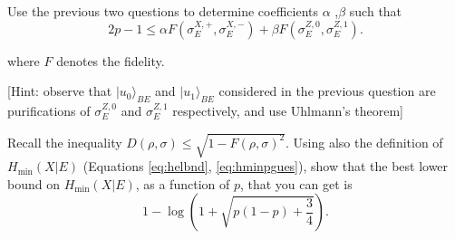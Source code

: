 \documentclass[a4paper,10pt,landscape,twocolumn]{scrartcl}
\begin{document}
\begin{exercise}
\begin{subex}[Problem 4]
Use the previous two questions to determine coefficients $\alpha$ ,$\beta$ such that
\begin{equation}
2p-1 \leq \alpha F(\sigma _ E^{X,+},\sigma _ E^{X,-}) + \beta F(\sigma _ E^{Z,0},\sigma _ E^{Z,1}).
\end{equation}


where $F$ denotes the fidelity.

[Hint: observe that $|u_0\rangle _{BE}$ and $|u_1\rangle _{BE}$ considered in the previous question are purifications of $\sigma _ E^{Z,0}$ and $\sigma _ E^{Z,1}$ respectively, and use Uhlmann's theorem] 
\end{subex}

\begin{subex}[Problem 5]
Recall the inequality $D(\rho ,\sigma ) \leq \sqrt {1-F(\rho ,\sigma )^2}$. Using also the definition of $H_{\min} (X|E)$ (Equations \eqref{eq:helbnd}, \eqref{eq:hminpgues}), show that the best lower bound on $H_{\min}(X|E)$, as a function of $p$, that you can get is 
\begin{equation}
1-\log \left(1+\sqrt {p(1-p)+\frac34}\right).
\end{equation}
\end{subex}


\end{exercise}
\end{document}
